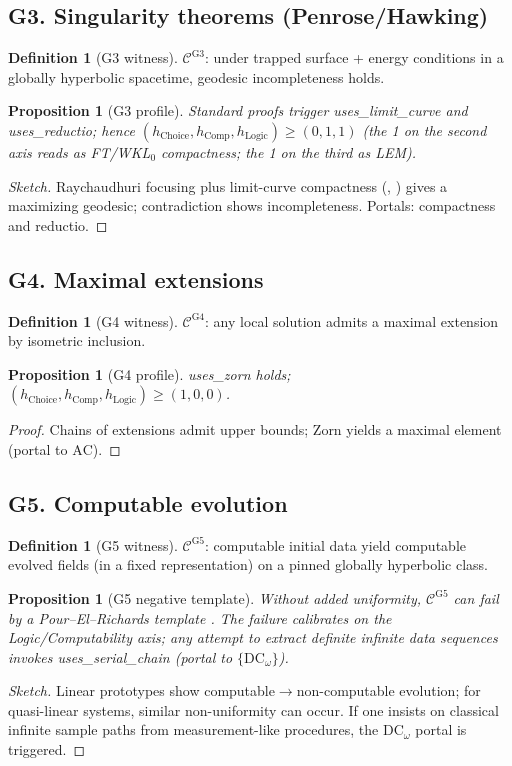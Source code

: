 \documentclass[11pt]{article}
\newtheorem{proposition}[theorem]{Proposition}
\theoremstyle{definition}
\newtheorem{definition}[theorem]{Definition}
\theoremstyle{remark}
\newcommand{\AC}{\mathrm{AC}}
\newcommand{\DCw}{\mathrm{DC}_\omega}
\newcommand{\hChoice}{h_{\mathrm{Choice}}}    %
\newcommand{\hComp}{h_{\mathrm{Comp}}}        %
\newcommand{\hLogic}{h_{\mathrm{Logic}}}      %
\begin{document}
\subsection*{G3. Singularity theorems (Penrose/Hawking)}
\begin{definition}[G3 witness]
$\mathcal{C}^{\mathrm{G3}}$: under trapped surface + energy conditions in a globally hyperbolic spacetime, geodesic incompleteness holds.
\end{definition}
\begin{proposition}[G3 profile]\label{prop:G3}
Standard proofs trigger \textsf{uses\_limit\_curve} and \textsf{uses\_reductio}; hence $(\hChoice,\hComp,\hLogic)\ge(0,1,1)$ (the 1 on the second axis reads as FT/WKL\(_0\) compactness; the 1 on the third as LEM).
\end{proposition}
\begin{proof}[Sketch]
Raychaudhuri focusing plus limit-curve compactness (\cite[§8]{HawkingEllis1973}, \cite[§14]{Wald1984}) gives a maximizing geodesic; contradiction shows incompleteness. Portals: compactness and reductio.
\end{proof}

\subsection*{G4. Maximal extensions}
\begin{definition}[G4 witness]
$\mathcal{C}^{\mathrm{G4}}$: any local solution admits a maximal extension by isometric inclusion.
\end{definition}
\begin{proposition}[G4 profile]\label{prop:G4}
\textsf{uses\_zorn} holds; $(\hChoice,\hComp,\hLogic)\ge(1,0,0)$.
\end{proposition}
\begin{proof}
Chains of extensions admit upper bounds; Zorn yields a maximal element (portal to $\AC$).
\end{proof}

\subsection*{G5. Computable evolution}
\begin{definition}[G5 witness]
$\mathcal{C}^{\mathrm{G5}}$: computable initial data yield computable evolved fields (in a fixed representation) on a pinned globally hyperbolic class.
\end{definition}
\begin{proposition}[G5 negative template]\label{prop:G5}
Without added uniformity, $\mathcal{C}^{\mathrm{G5}}$ can fail by a Pour--El--Richards template \cite{PourElRichards1989}. The failure calibrates on the Logic/Computability axis; any attempt to extract definite infinite data sequences invokes \textsf{uses\_serial\_chain} (portal to $\{\DCw\}$).
\end{proposition}
\begin{proof}[Sketch]
Linear prototypes show computable$\to$non-computable evolution; for quasi-linear systems, similar non-uniformity can occur. If one insists on classical infinite sample paths from measurement-like procedures, the $\DCw$ portal is triggered.
\end{proof}
\end{document}
